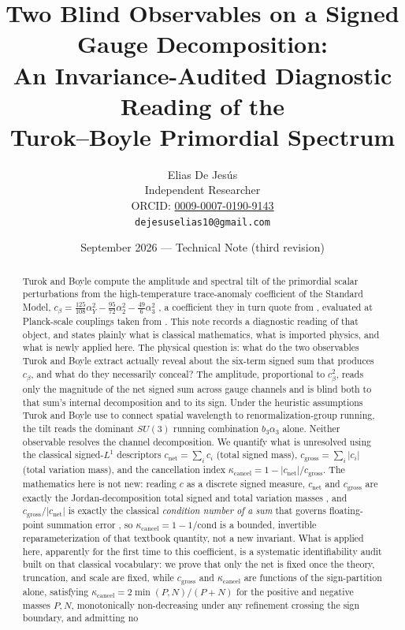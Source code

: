 \documentclass[11pt]{article}
\title{Two Blind Observables on a Signed Gauge Decomposition:\\
An Invariance-Audited Diagnostic Reading of the\\
Turok--Boyle Primordial Spectrum}
\author{Elias De Jes\'us\\ \small Independent Researcher\\ \small ORCID: \href{https://orcid.org/0009-0007-0190-9143}{0009-0007-0190-9143}\\ \small \texttt{dejesuselias10@gmail.com}}
\date{September 2026 --- Technical Note (third revision)}
\theoremstyle{definition}
\theoremstyle{remark}
\newcommand{\net}{c_{\mathrm{net}}}
\newcommand{\gross}{c_{\mathrm{gross}}}
\newcommand{\kcancel}{\kappa_{\mathrm{cancel}}}
\newcommand{\cond}{\mathrm{cond}}
\begin{document}
\maketitle

\begin{abstract}
Turok and Boyle compute the amplitude and spectral tilt of the primordial scalar perturbations
from the high-temperature trace-anomaly coefficient of the Standard Model,
$c_\beta = \tfrac{125}{108}\alpha_Y^2 - \tfrac{95}{72}\alpha_2^2 - \tfrac{49}{6}\alpha_3^2$
\citep{TurokBoyle2023}, a coefficient they in turn quote from \citet{ArnoldZhai1995}, evaluated at
Planck-scale couplings taken from \citet{Buttazzo2013}. This note records a diagnostic reading of
that object, and states plainly what is classical mathematics, what is imported physics, and what
is newly applied here. The physical question is: what do the two observables Turok and Boyle
extract actually reveal about the six-term signed sum that produces $c_\beta$, and what do they
necessarily conceal? The amplitude, proportional to $c_\beta^2$, reads only the magnitude of the
net signed sum across gauge channels and is blind both to that sum's internal decomposition and to
its sign. Under the heuristic assumptions Turok and Boyle use to connect spatial wavelength to
renormalization-group running, the tilt reads the dominant $SU(3)$ running combination $b_3\alpha_3$
alone. Neither observable resolves the channel decomposition. We quantify what is unresolved using
the classical signed-$L^1$ descriptors $\net = \sum_i c_i$ (total signed mass), $\gross = \sum_i
|c_i|$ (total variation mass), and the cancellation index $\kcancel = 1 - |\net|/\gross$. The
mathematics here is not new: reading $c$ as a discrete signed measure, $\net$ and $\gross$ are
exactly the Jordan-decomposition total signed and total variation masses \citep{Bogachev2007}, and
$\gross/|\net|$ is exactly the classical \emph{condition number of a sum} that governs
floating-point summation error \citep{Higham1993}, so $\kcancel = 1 - 1/\cond$ is a bounded,
invertible reparameterization of that textbook quantity, not a new invariant. What is applied here,
apparently for the first time to this coefficient, is a systematic identifiability audit built on
that classical vocabulary: we prove that only the net is fixed once the theory, truncation, and
scale are fixed, while $\gross$ and $\kcancel$ are functions of the sign-partition alone, satisfying
$\kcancel = 2\min(P,N)/(P+N)$ for the positive and negative masses $P,N$, monotonically
non-decreasing under any refinement crossing the sign boundary, and admitting no

\end{abstract}
\end{document}
